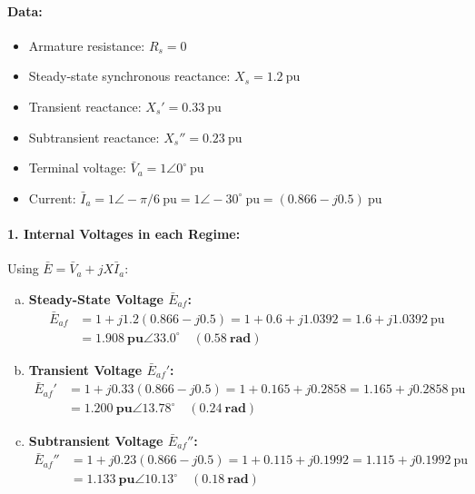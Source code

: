 \paragraph{Data:}
\begin{itemize}
    \item Armature resistance: $R_s = 0$
    \item Steady-state synchronous reactance: $X_s = 1.2\ \text{pu}$
    \item Transient reactance: $X_s' = 0.33\ \text{pu}$
    \item Subtransient reactance: $X_s'' = 0.23\ \text{pu}$
    \item Terminal voltage: $\bar{V}_a = 1\angle 0^\circ\ \text{pu}$
    \item Current: $\bar{I}_a = 1\angle -\pi/6\ \text{pu} = 1\angle -30^\circ\ \text{pu} = (0.866 - j0.5)\ \text{pu}$
\end{itemize}

\paragraph{1. Internal Voltages in each Regime:}
Using $\bar{E} = \bar{V}_a + j X \bar{I}_a$:
\begin{enumerate}[(a)]
    \item \textbf{Steady-State Voltage $\bar{E}_{af}$:}
    \begin{align}
        \bar{E}_{af} &= 1 + j 1.2(0.866 - j0.5) = 1 + 0.6 + j 1.0392 = 1.6 + j 1.0392\ \text{pu} \nonumber\\
                     &= \boxed{\mathbf{1.908\ \text{pu} \angle 33.0^\circ \quad (0.58\ \text{rad})}}
    \end{align}

    \item \textbf{Transient Voltage $\bar{E}_{af}'$:}
    \begin{align}
        \bar{E}_{af}' &= 1 + j 0.33(0.866 - j0.5) = 1 + 0.165 + j 0.2858 = 1.165 + j 0.2858\ \text{pu} \nonumber\\
                      &= \boxed{\mathbf{1.200\ \text{pu} \angle 13.78^\circ \quad (0.24\ \text{rad})}}
    \end{align}

    \item \textbf{Subtransient Voltage $\bar{E}_{af}''$:}
    \begin{align}
        \bar{E}_{af}'' &= 1 + j 0.23(0.866 - j0.5) = 1 + 0.115 + j 0.1992 = 1.115 + j 0.1992\ \text{pu} \nonumber\\
                       &= \boxed{\mathbf{1.133\ \text{pu} \angle 10.13^\circ \quad (0.18\ \text{rad})}}
    \end{align}
\end{enumerate}

